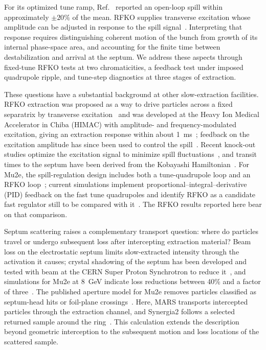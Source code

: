 \documentclass[a4paper,fleqn]{cas-sc}
\begin{document}
For its optimized tune ramp, Ref.~\cite{mu2e} reported an open-loop spill within approximately $\pm20\%$ of the mean. RFKO supplies transverse excitation whose amplitude can be adjusted in response to the spill signal~\cite{HB10,ipac11}. Interpreting that response requires distinguishing coherent motion of the bunch from growth of its internal phase-space area, and accounting for the finite time between destabilization and arrival at the septum. We address these aspects through fixed-tune RFKO tests at two chromaticities, a feedback test under imposed quadrupole ripple, and tune-step diagnostics at three stages of extraction.

These questions have a substantial background at other slow-extraction facilities. RFKO extraction was proposed as a way to drive particles across a fixed separatrix by transverse excitation~\cite{hiramoto} and was developed at the Heavy Ion Medical Accelerator in Chiba (HIMAC) with amplitude- and frequency-modulated excitation, giving an extraction response within about \SI{1}{ms}~\cite{noda}; feedback on the excitation amplitude has since been used to control the spill~\cite{furukawa}. Recent knock-out studies optimize the excitation signal to minimize spill fluctuations~\cite{niedermayer}, and transit times to the septum have been derived from the Kobayashi Hamiltonian~\cite{pullia}. For Mu2e, the spill-regulation design includes both a tune-quadrupole loop and an RFKO loop~\cite{srs2019}; current simulations implement proportional--integral--derivative (PID) feedback on the fast tune quadrupoles and identify RFKO as a candidate fast regulator still to be compared with it~\cite{srs2025}. The RFKO results reported here bear on that comparison.

Septum scattering raises a complementary transport question: where do particles travel or undergo subsequent loss after intercepting extraction material? Beam loss on the electrostatic septum limits slow-extracted intensity through the activation it causes; crystal shadowing of the septum has been developed and tested with beam at the CERN Super Proton Synchrotron to reduce it~\cite{velotti}, and simulations for Mu2e at \SI{8}{GeV} indicate loss reductions between 40\% and a factor of three~\cite{crystal8gev}. The published aperture model for Mu2e removes particles classified as septum-head hits or foil-plane crossings~\cite{mu2e}. Here, MARS transports intercepted particles through the extraction channel, and Synergia2 follows a selected returned sample around the ring~\cite{mars1,mars2}. This calculation extends the description beyond geometric interception to the subsequent motion and loss locations of the scattered sample.
\end{document}
